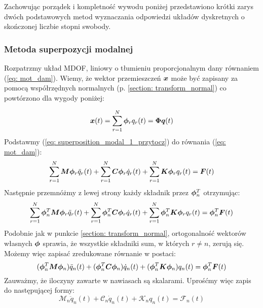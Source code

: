  Zachowując porządek i kompletność wywodu poniżej przedstawiono krótki zarys dwóch podstawowych metod wyznaczania odpowiedzi układów dyskretnych o skończonej liczbie stopni swobody.
 
 \subsubsection{Metoda superpozycji modalnej}
Rozpatrzmy układ MDOF, liniowy o tłumieniu proporcjonalnym dany równaniem (\ref{eq: mot_dam}). Wiemy, że wektor przemieszczeń $\bm{x}$ może być zapisany za pomocą współrzędnych normalnych (p. \ref{section: transform_normal}) co powtórzono dla wygody poniżej:

\begin{equation} \label{eq: superposition_modal_1_przytocz}
	\bm{x}(t) = \sum_{r=1}^{N} \bm{\phi}_r q_r(t)=\bm{\Phi q}(t)
\end{equation} 
Podstawmy (\ref{eq: superposition_modal_1_przytocz}) do równania (\ref{eq: mot_dam}):
\begin{equation} \label{eq: superposition_modal_2_podstaw}
	\sum_{r=1}^{N} \bm{M} \bm{\phi}_r \ddot{q}_r(t) +\sum_{r=1}^{N} \bm{C}\bm{\phi}_r \dot{q}_r(t) + \sum_{r=1}^{N} \bm{K}\bm{\phi}_r q_r(t) = \bm{F}(t)
\end{equation} 
Następnie przemnóżmy z lewej strony każdy składnik przez $\bm{\phi}_n^T$ otrzymując:
\begin{equation} \label{eq: superposition_modal_3_przemnoz}
	\sum_{r=1}^{N} \bm{\phi}_n^T \bm{M} \bm{\phi}_r \ddot{q}_r(t) +\sum_{r=1}^{N} \bm{\phi}_n^T \bm{C}\bm{\phi}_r \dot{q}_r(t) + \sum_{r=1}^{N} \bm{\phi}_n^T \bm{K}\bm{\phi}_r q_r(t) = \bm{\phi}_n^T \bm{F}(t)
\end{equation} 
Podobnie jak w punkcie \ref{section: transform_normal}, ortogonalność wektorów własnych $\bm{\phi}$ sprawia, że wszystkie składniki sum, w których $r\neq n$, zerują się. Możemy więc zapisać zredukowane równanie w postaci:
\begin{equation} \label{eq: superposition_modal_4_orto}
	 (\bm{\phi}_n^T \bm{M} \bm{\phi}_n )\ddot{q}_n(t) + (\bm{\phi}_n^T \bm{C}\bm{\phi}_n) \dot{q}_n(t) + (\bm{\phi}_n^T \bm{K}\bm{\phi}_n) q_n(t) = \bm{\phi}_n^T \bm{F}(t)
\end{equation} 
Zauważmy, że iloczyny zawarte w nawiasach są skalarami. Uprośćmy więc zapis do następującej formy:
\begin{equation} \label{eq: superposition_modal_5_uprosc}
	\mathcal{M}_n\ddot{q}_n(t) + \mathcal{C}_n\dot{q}_n(t) + \mathcal{K}_n q_n(t) = \mathcal{F}_n(t)
\end{equation} 
